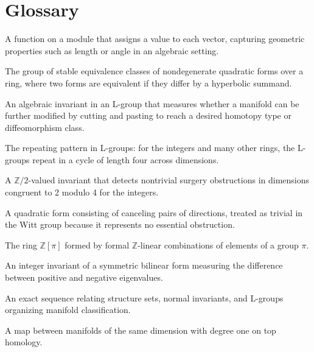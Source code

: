 \section*{Glossary}
\begin{description}[leftmargin=*,style=nextline,itemsep=0.3em]
\item[\textbf{Quadratic form.}] A function on a module that assigns a value to each vector, capturing geometric properties such as length or angle in an algebraic setting.
\item[\textbf{Witt group.}] The group of stable equivalence classes of nondegenerate quadratic forms over a ring, where two forms are equivalent if they differ by a hyperbolic summand.
\item[\textbf{Surgery obstruction.}] An algebraic invariant in an L-group that measures whether a manifold can be further modified by cutting and pasting to reach a desired homotopy type or diffeomorphism class.
\item[\textbf{Four-periodicity.}] The repeating pattern in L-groups: for the integers and many other rings, the L-groups repeat in a cycle of length four across dimensions.
\item[\textbf{Arf invariant.}] A $\mathbb{Z}/2$-valued invariant that detects nontrivial surgery obstructions in dimensions congruent to 2 modulo 4 for the integers.
\item[\textbf{Hyperbolic form.}] A quadratic form consisting of canceling pairs of directions, treated as trivial in the Witt group because it represents no essential obstruction.
\item[\textbf{Group ring.}] The ring $\mathbb{Z}[\pi]$ formed by formal $\mathbb{Z}$-linear combinations of elements of a group $\pi$.
\item[\textbf{Signature.}] An integer invariant of a symmetric bilinear form measuring the difference between positive and negative eigenvalues.
\item[\textbf{Surgery exact sequence.}] An exact sequence relating structure sets, normal invariants, and L-groups organizing manifold classification.
\item[\textbf{Degree-one normal map.}] A map between manifolds of the same dimension with degree one on top homology.
\end{description}

